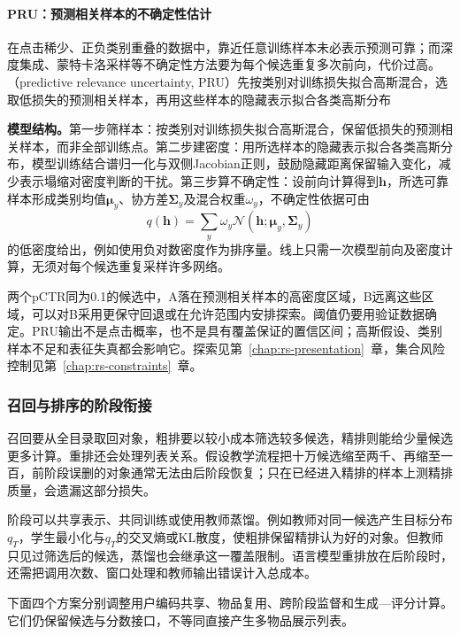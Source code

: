 \paragraph{PRU：预测相关样本的不确定性估计}
\label{sec:rs-pru}

在点击稀少、正负类别重叠的数据中，靠近任意训练样本未必表示预测可靠；而深度集成、蒙特卡洛采样等不确定性方法要为每个候选重复多次前向，代价过高。（predictive relevance uncertainty, PRU）先按类别对训练损失拟合高斯混合，选取低损失的预测相关样本，再用这些样本的隐藏表示拟合各类高斯分布

\textbf{模型结构。}第一步筛样本：按类别对训练损失拟合高斯混合，保留低损失的预测相关样本，而非全部训练点。第二步建密度：用所选样本的隐藏表示拟合各类高斯分布，模型训练结合谱归一化与双侧Jacobian正则，鼓励隐藏距离保留输入变化，减少表示塌缩对密度判断的干扰。第三步算不确定性：设前向计算得到$\bm h$，所选可靠样本形成类别均值$\bm\mu_y$、协方差$\bm\Sigma_y$及混合权重$\omega_y$，不确定性依据可由
\[
 q(\bm h)=\sum_y\omega_y
   \mathcal N(\bm h;\bm\mu_y,\bm\Sigma_y)
\]
的低密度给出，例如使用负对数密度作为排序量。线上只需一次模型前向及密度计算，无须对每个候选重复采样许多网络。

两个pCTR同为0.1的候选中，A落在预测相关样本的高密度区域，B远离这些区域，可以对B采用更保守回退或在允许范围内安排探索。阈值仍要用验证数据确定。PRU输出不是点击概率，也不是具有覆盖保证的置信区间；高斯假设、类别样本不足和表征失真都会影响它。探索见第~\ref{chap:rs-presentation}~章，集合风险控制见第~\ref{chap:rs-constraints}~章。

\subsubsection{召回与排序的阶段衔接}
\label{sec:rs-stage-connection}

召回要从全目录取回对象，粗排要以较小成本筛选较多候选，精排则能给少量候选更多计算。重排还会处理列表关系。假设教学流程把十万候选缩至两千、再缩至一百，前阶段误删的对象通常无法由后阶段恢复；只在已经进入精排的样本上测精排质量，会遗漏这部分损失。

阶段可以共享表示、共同训练或使用教师蒸馏。例如教师对同一候选产生目标分布$q_T$，学生最小化与$q_T$的交叉熵或KL散度，使粗排保留精排认为好的对象。但教师只见过筛选后的候选，蒸馏也会继承这一覆盖限制。语言模型重排放在后阶段时，还需把调用次数、窗口处理和教师输出错误计入总成本。

下面四个方案分别调整用户编码共享、物品复用、跨阶段监督和生成—评分计算。它们仍保留候选与分数接口，不等同直接产生多物品展示列表。

